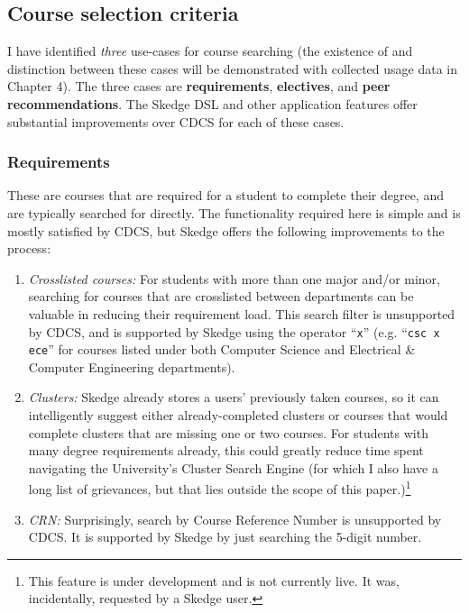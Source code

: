 \subsection{Course selection criteria}

I have identified \emph{three} use-cases for course searching (the existence of and distinction between these cases will be demonstrated with collected usage data in Chapter 4). The three cases are \textbf{requirements}, \textbf{electives}, and \textbf{peer recommendations}. The Skedge DSL and other application features offer substantial improvements over CDCS for each of these cases. 

  \subsubsection{Requirements}

  These are courses that are required for a student to complete their degree, and are typically searched for directly. The functionality required here is simple and is mostly satisfied by CDCS, but Skedge offers the following improvements to the process:

  \begin{enumerate}
    \item \emph{Crosslisted courses:} For students with more than one major and/or minor, searching for courses that are crosslisted between departments can be valuable in reducing their requirement load. This search filter is unsupported by CDCS, and is supported by Skedge using the operator ``{\tt x}'' (e.g. ``{\tt csc x ece}'' for courses listed under both Computer Science and Electrical \& Computer Engineering departments).

    \item \emph{Clusters:} Skedge already stores a users' previously taken courses, so it can intelligently suggest either already-completed clusters or courses that would complete clusters that are missing one or two courses. For students with many degree requirements already, this could greatly reduce time spent navigating the University's Cluster Search Engine (for which I also have a long list of grievances, but that lies outside the scope of this paper.)\footnote{This feature is under development and is not currently live. It was, incidentally, requested by a Skedge user.}

    \item \emph{CRN:} Surprisingly, search by Course Reference Number is unsupported by CDCS. It is supported by Skedge by just searching the 5-digit number.
  \end{enumerate}

